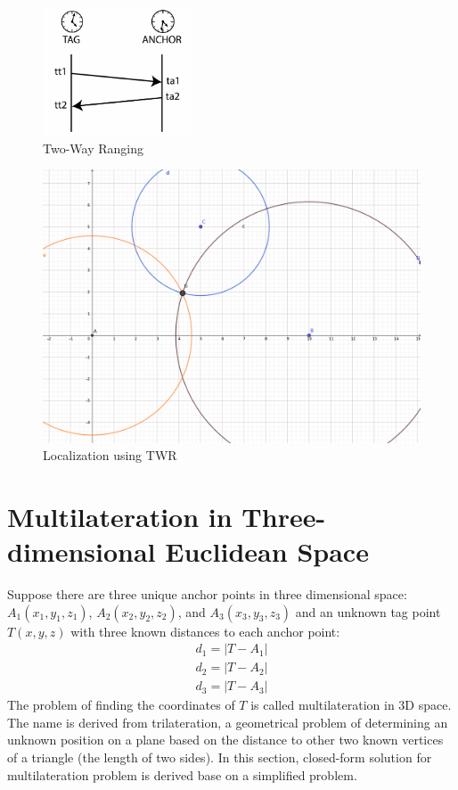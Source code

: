 \documentclass[\main/thesis.tex]{subfiles}
\begin{document}
\begin{figure}[H]
    \centering
    \includegraphics[width=0.4\textwidth]{twr_protocol.png}
    \caption{Two-Way Ranging}
    \label{fig:twr_anchor_and_tag}
\end{figure}

\begin{figure}[H]
    \centering
    \includegraphics[width=1\textwidth]{twr.png}
    \caption{Localization using TWR}
    \label{fig:twr_trilateration}
\end{figure}

\section{Multilateration in Three-dimensional Euclidean Space}
\label{sec:localization_using_multilateration}

Suppose there are three unique anchor points in three dimensional space: $A_1(x_1, y_1,z_1)$, $A_2(x_2, y_2,z_2)$,
and $A_3(x_3, y_3,z_3)$ and an unknown tag point $T(x,y,z)$ with three known distances to each anchor point:
\begin{equation}
    \begin{split}
        d_1 = | T - A_1| \\
        d_2 = | T - A_2| \\
        d_3 = | T - A_3|
    \end{split}
\end{equation}
The problem of finding the coordinates of $T$ is called multilateration in 3D space. The name is derived from trilateration, a  geometrical problem of determining an unknown position on a plane based on the distance to other two known vertices of a triangle (the length of two sides). In this section, closed-form solution for multilateration problem is derived base on a simplified problem.
\end{document}
